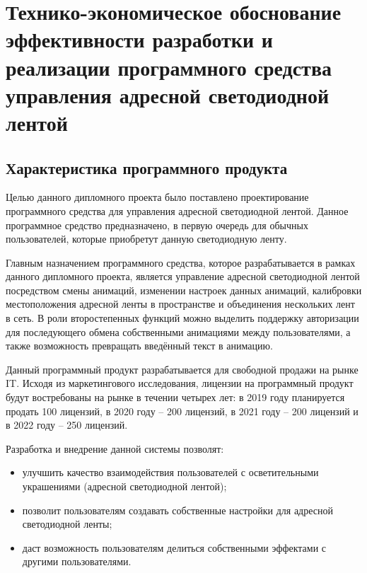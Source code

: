 
\nocite{palitsyn}
\nocite{nosenko}
\section{Технико-экономическое обоснование эффективности разработки и реализации программного средства управления адресной светодиодной лентой}
\label{sec:economic}

\subsection{Характеристика программного продукта} %
\label{sec:economic:characteristic}

Целью данного дипломного проекта было поставлено проектирование программного средства для управления адресной светодиодной лентой. Данное программное средство предназначено, в первую очередь для обычных пользователей, которые приобретут данную светодиодную ленту.

Главным назначением программного средства, которое разрабатывается в рамках данного дипломного проекта, является управление адресной светодиодной лентой посредством смены анимаций, изменении настроек данных анимаций, калибровки местоположения адресной ленты в пространстве и объединения нескольких лент в сеть. В роли второстепенных функций можно выделить поддержку авторизации для последующего обмена собственными анимациями между пользователями, а также возможность превращать введённый текст в анимацию.

Данный программный продукт разрабатывается для свободной продажи на рынке IT. Исходя из маркетингового исследования, лицензии на программный продукт будут востребованы на рынке в течении четырех лет: в 2019 году планируется продать 100 лицензий, в 2020 году – 200 лицензий, в 2021 году – 200 лицензий и в 2022 году – 250 лицензий.

Разработка и внедрение данной системы позволят:
\begin{itemize}
    \item улучшить качество взаимодействия пользователей с осветительными украшениями (адресной светодиодной лентой);
    \item позволит пользователям создавать собственные настройки для адресной светодиодной ленты;
    \item даст возможность пользователям делиться собственными эффектами с другими пользователями.
\end{itemize}

